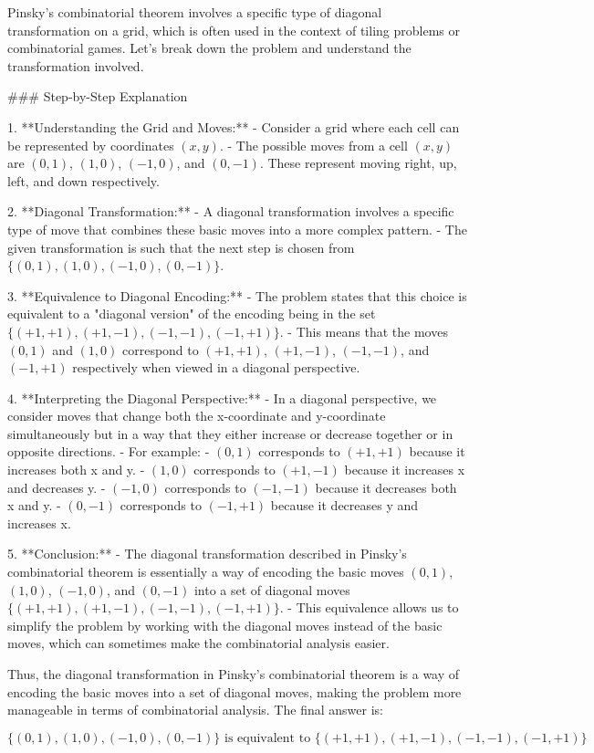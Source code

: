 Pinsky's combinatorial theorem involves a specific type of diagonal transformation on a grid, which is often used in the context of tiling problems or combinatorial games. Let's break down the problem and understand the transformation involved.

### Step-by-Step Explanation

1. **Understanding the Grid and Moves:**
   - Consider a grid where each cell can be represented by coordinates \((x, y)\).
   - The possible moves from a cell \((x, y)\) are \((0, 1)\), \((1, 0)\), \((-1, 0)\), and \((0, -1)\). These represent moving right, up, left, and down respectively.

2. **Diagonal Transformation:**
   - A diagonal transformation involves a specific type of move that combines these basic moves into a more complex pattern.
   - The given transformation is such that the next step is chosen from \(\{(0,1), (1,0), (-1,0), (0,-1)\}\).

3. **Equivalence to Diagonal Encoding:**
   - The problem states that this choice is equivalent to a "diagonal version" of the encoding being in the set \(\{(+1,+1), (+1,-1), (-1,-1), (-1,+1)\}\).
   - This means that the moves \((0,1)\) and \((1,0)\) correspond to \((+1,+1)\), \((+1,-1)\), \((-1,-1)\), and \((-1,+1)\) respectively when viewed in a diagonal perspective.

4. **Interpreting the Diagonal Perspective:**
   - In a diagonal perspective, we consider moves that change both the x-coordinate and y-coordinate simultaneously but in a way that they either increase or decrease together or in opposite directions.
   - For example:
     - \((0,1)\) corresponds to \((+1,+1)\) because it increases both x and y.
     - \((1,0)\) corresponds to \((+1,-1)\) because it increases x and decreases y.
     - \((-1,0)\) corresponds to \((-1,-1)\) because it decreases both x and y.
     - \((0,-1)\) corresponds to \((-1,+1)\) because it decreases y and increases x.

5. **Conclusion:**
   - The diagonal transformation described in Pinsky's combinatorial theorem is essentially a way of encoding the basic moves \((0,1)\), \((1,0)\), \((-1,0)\), and \((0,-1)\) into a set of diagonal moves \(\{(+1,+1), (+1,-1), (-1,-1), (-1,+1)\}\).
   - This equivalence allows us to simplify the problem by working with the diagonal moves instead of the basic moves, which can sometimes make the combinatorial analysis easier.

Thus, the diagonal transformation in Pinsky's combinatorial theorem is a way of encoding the basic moves into a set of diagonal moves, making the problem more manageable in terms of combinatorial analysis. The final answer is:

\[
\boxed{\{(0,1), (1,0), (-1,0), (0,-1)\} \text{ is equivalent to } \{(+1,+1), (+1,-1), (-1,-1), (-1,+1)\}}
\]